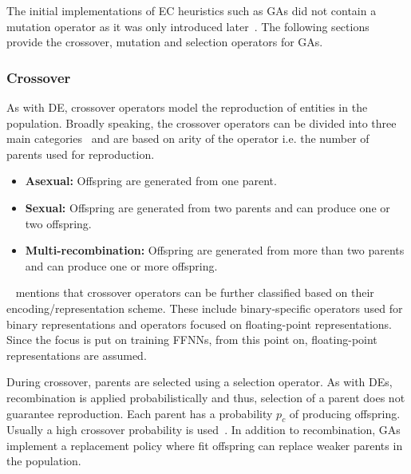 The initial implementations of \acs{EC} heuristics such as \acp{GA} did not contain a mutation operator as it was only introduced later~\cite{ref:engelbrecht:2007}. The following sections provide the crossover, mutation and selection operators for \acp{GA}.

\subsubsection{Crossover}\label{sec:heuristics:mh:ga:crossover}

As with \acs{DE}, crossover operators model the reproduction of entities in the population. Broadly speaking, the crossover operators can be divided into three main categories~\cite{ref:engelbrecht:2007} and are based on arity of the operator i.e. the number of parents used for reproduction.

\begin{itemize}
      \item \textbf{Asexual:} Offspring are generated from one parent.

      \item \textbf{Sexual:} Offspring are generated from two parents and can produce one or two offspring.

      \item \textbf{Multi-recombination:} Offspring are generated from more than two parents and can produce one or more offspring.
\end{itemize}

\citeauthor{ref:engelbrecht:2007}~\cite{ref:engelbrecht:2007} mentions that crossover operators can be further classified based on their encoding/representation scheme. These include binary-specific operators used for binary representations and operators focused on floating-point representations. Since the focus is put on training \acp{FFNN}, from this point on, floating-point representations are assumed.

During crossover, parents are selected using a selection operator. As with \acp{DE}, recombination is applied probabilistically and thus, selection of a parent does not guarantee reproduction. Each parent has a probability $p_{c}$ of producing offspring. Usually a high crossover probability is used~\cite{ref:engelbrecht:2007}. In addition to recombination, \acp{GA} implement a replacement policy where fit offspring can replace weaker parents in the population.


